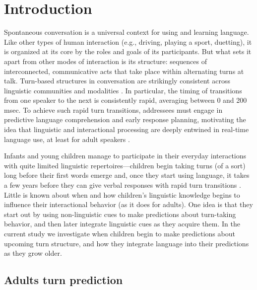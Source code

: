 \documentclass[authoryear, 12pt]{elsarticle}
\begin{document}
\linenumbers

\section{Introduction}
\label{sec:intro}

Spontaneous conversation is a universal context for using and learning language. Like other types of human interaction (e.g., driving, playing a sport, duetting), it is organized at its core by the roles and goals of its participants. But what sets it apart from other modes of interaction is its structure: sequences of interconnected, communicative acts that take place within alternating turns at talk. Turn-based structures in conversation are strikingly consistent across linguistic communities and  modalities \citep{de-vosInPrep, dingemanse2013, stivers2009}. In particular, the timing of transitions from one speaker to the next is consistently rapid, averaging between 0 and 200 msec. To achieve such rapid turn transitions, addressees must engage in predictive language comprehension and early response planning, motivating the idea that linguistic and interactional processing are deeply entwined in real-time language use, at least for adult speakers \citep{levinson2013}.

Infants and young children manage to participate in their everyday interactions with quite limited linguistic repertoires---children begin taking turns (of a sort) long before their first words emerge \citep[age 3--4 months: see, e.g.,][]{bateson1975, hilbrinkUR, jaffe2001, snow1977} and, once they start using language, it takes a few years before they can give verbal responses with rapid turn transitions \citep{casillas2015, garvey1984, ervin-tripp1979}. Little is known about when and how children's linguistic knowledge begins to influence their  interactional behavior (as it does for adults). One idea is that they start out by using non-linguistic cues to make predictions about turn-taking behavior, and then later integrate linguistic cues as they acquire them. In the current study we investigate when children begin to make predictions about upcoming turn structure, and how they integrate language into their predictions as they grow older.


\subsection{Adults turn prediction}
\end{document}
